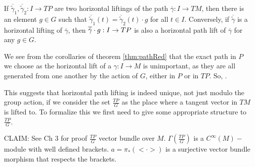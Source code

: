 \begin{corollary}
If $\overline{\tilde{\gamma}}_1, \overline{\tilde{\gamma}}_2: I \to TP$ are two horizontal liftings of the path $\overline{\gamma}:I \to TM$, then there is an element $g \in G$ such that $\overline{\tilde{\gamma}}_1 (t) = \overline{\tilde{\gamma}}_2 (t) \cdot g$ for all $t \in I$. Conversely, if $\overline{\tilde{\gamma}}$ is a horizontal lifting of $\overline{\gamma}$, then $\overline{\Tilde{\gamma}}\cdot g :I \to TP$ is also a horizontal path lift of $\overline{\gamma}$ for any $g\in G$.%
\end{corollary}

We see from the corollaries of theorem \ref{thm:pathRed} that the exact path in $P$ we choose as the horizontal lift of a $\gamma:I \to M$ is unimportant, as they are all generated from one another by the action of $G$, either in $P$ or in $TP$. So, .

This suggests that horizontal path lifting is indeed unique, not just modulo the group action, if we consider the set $\frac{TP}{G}$ as the place where a tangent vector in $TM$ is lifted to. To formalize this we first need to give some appropriate structure to $\frac{TP}{G}$.

\begin{definition} CLAIM: See Ch 3 for proof
$\frac{TP}{G}$ vector bundle over $M$. $\Gamma(\frac{TP}{G})$ is a $C^\infty(M)-$module with well defined brackets. $a = \pi_{*}(<\cdot>)$ is a surjective vector bundle morphism that respects the brackets.  
\end{definition}

